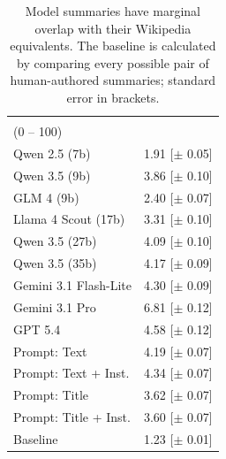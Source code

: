 \documentclass{article} %
\begin{document}
\begin{table}
  \vspace{-10pt}
  \small
  \centering
  \begin{tabular}{lc}
    \textbf{} & \makecell{\textbf{BLEU Score}\\(0 -- 100)} \\
    \midrule
    Qwen 2.5 (7b) & 1.91 [$\pm$ 0.05] \\
    Qwen 3.5 (9b) & 3.86 [$\pm$ 0.10]\\
    GLM 4 (9b) & 2.40 [$\pm$ 0.07] \\
    Llama 4 Scout (17b) & 3.31 [$\pm$ 0.10] \\
    Qwen 3.5 (27b) & 4.09 [$\pm$ 0.10] \\
    Qwen 3.5 (35b) & 4.17 [$\pm$ 0.09] \\
    Gemini 3.1 Flash-Lite & 4.30 [$\pm$ 0.09] \\
    Gemini 3.1 Pro & 6.81 [$\pm$ 0.12] \\
    GPT 5.4 & 4.58 [$\pm$ 0.12] \\
    \midrule
    Prompt: Text & 4.19 [$\pm$ 0.07] \\
    Prompt: Text + Inst. & 4.34 [$\pm$ 0.07] \\
    Prompt: Title & 3.62 [$\pm$ 0.07] \\
    Prompt: Title + Inst. & 3.60 [$\pm$ 0.07] \\
    \midrule
    Baseline & 1.23 [$\pm$ 0.01] \\
    \bottomrule
  \end{tabular}
  \caption{Model summaries have marginal overlap with their Wikipedia equivalents. The baseline is calculated by comparing every possible pair of human-authored summaries; standard error in brackets.}
  \label{tab:modelHumanSims}
  \vspace{-10pt}
\end{table}
\end{document}
